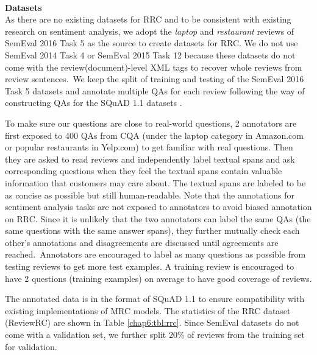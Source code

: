 \\

\textbf{Datasets}\\
As there are no existing datasets for RRC and
to be consistent with existing research on sentiment analysis, we adopt the \textit{laptop} and \textit{restaurant} reviews of SemEval 2016 Task 5 as the source to create datasets for RRC.
We do not use SemEval 2014 Task 4 or SemEval 2015 Task 12 because these datasets do not come with the review(document)-level XML tags to recover whole reviews from review sentences.~We keep the split of training and testing of the SemEval 2016 Task 5 datasets and annotate multiple QAs for each review following the way of constructing QAs for the SQuAD 1.1 datasets \cite{rajpurkar2016squad}.

To make sure our questions are close to real-world questions, 2 annotators are first exposed to 400 QAs from CQA (under the laptop category in Amazon.com or popular restaurants in Yelp.com) to get familiar with real questions.
Then they are asked to read reviews and independently label textual spans and ask corresponding questions when they feel the textual spans contain valuable information that customers may care about.
The textual spans are labeled to be as concise as possible but still human-readable.
Note that the annotations for sentiment analysis tasks are not exposed to annotators to avoid biased annotation on RRC.
Since it is unlikely that the two annotators can label the same QAs (the same questions with the same answer spans), they further mutually check each other's annotations and disagreements are discussed until agreements are reached.~Annotators are encouraged to label as many questions as possible from testing reviews to get more test examples. A training review is encouraged to have 2 questions (training examples) on average to have good coverage of reviews.

The annotated data is in the format of SQuAD 1.1 \cite{rajpurkar2016squad} to ensure compatibility with existing implementations of MRC models. The statistics of the RRC dataset (ReviewRC) are shown in Table \ref{chap6:tbl:rrc}. 
Since SemEval datasets do not come with a validation set, we further split 20\% of reviews from the training set for validation.

\begin{table}[H]
    \centering
    \caption{Statistics of ReviewRC Dataset}
\label{chap6:tbl:rrc}
\end{table}


